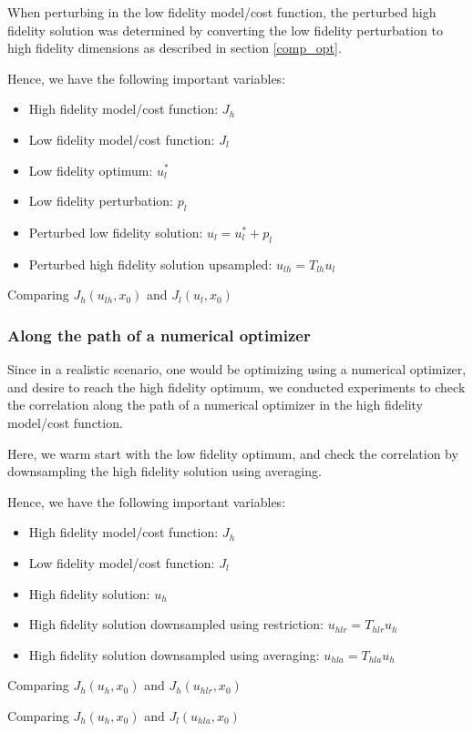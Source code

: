 \documentclass{article}
\begin{document}
When perturbing in the low fidelity model/cost function, the perturbed high fidelity solution was determined
by converting the low fidelity perturbation to high fidelity dimensions as described in section \ref{comp_opt}.

Hence, we have the following important variables:

\begin{itemize}
  \item High fidelity model/cost function: $J_h$
  \item Low fidelity model/cost function: $J_l$
  \item Low fidelity optimum: $u_l^*$
  \item Low fidelity perturbation: $p_l$
  \item Perturbed low fidelity solution: $u_l = u_l^* + p_l$
  \item Perturbed high fidelity solution upsampled: $u_{lh} = T_{lh} u_l$
\end{itemize}

Comparing $J_h(u_{lh}, x_0)$ and $J_l(u_l, x_0)$

\subsubsection{Along the path of a numerical optimizer}

Since in a realistic scenario, one would be optimizing using a numerical optimizer, and desire to reach the high fidelity optimum,
we conducted experiments to check the correlation along the path of a numerical optimizer in the high fidelity model/cost function.

Here, we warm start with the low fidelity optimum, and check the correlation by downsampling the high fidelity solution using averaging.

Hence, we have the following important variables:

\begin{itemize}
  \item High fidelity model/cost function: $J_h$
  \item Low fidelity model/cost function: $J_l$
  \item High fidelity solution: $u_h$
  \item High fidelity solution downsampled using restriction: $u_{hlr} = T_{hlr} u_h$
  \item High fidelity solution downsampled using averaging: $u_{hla} = T_{hla} u_h$
\end{itemize}

Comparing $J_h(u_h, x_0)$ and $J_h(u_{hlr}, x_0)$

Comparing $J_h(u_h, x_0)$ and $J_l(u_{hla}, x_0)$
\end{document}
